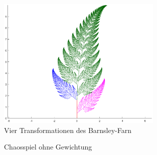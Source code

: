 \begin{figure}
	\centering
	\includegraphics[width=0.7\textwidth]{papers/ifs/images/farncolor}
	\caption{Vier Transformationen des Barnsley-Farn}
	\label{ifs:farncolor}
\end{figure}
\begin{figure}	
	\centering
	\caption{Chaosspiel ohne Gewichtung}
	\label{ifs:farnNoWeight}
\end{figure}
